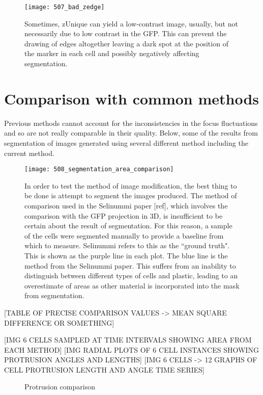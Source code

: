 \begin{figure}[h!]
 \centering
 \texttt{[image: 507\_bad\_zedge]}
 \caption[Ineffective zEdge]{
 	Sometimes, zUnique can yield a low-contrast image, usually, but not necessarily due to low contrast in the GFP. This can prevent the drawing of edges altogether leaving a dark spot at the position of the marker in each cell and possibly negatively affecting segmentation.
 }
 \label{fig:badzedge}
\end{figure}

\section{Comparison with common methods}

Previous methods cannot account for the inconsistencies in the focus fluctuations and so are not really comparable in their quality. Below, some of the results from segmentation of images generated using several different method including the current method.

\begin{figure}[h!]
 \centering
 \texttt{[image: 508\_segmentation\_area\_comparison]}
 \caption[Testing: segmentation area comparison]{
 	In order to test the method of image modification, the best thing to be done is attempt to segment the images produced. The method of comparison used in the Selinummi paper [ref], which involves the comparison with the GFP projection in 3D, is insufficient to be certain about the result of segmentation. For this reason, a sample of the cells were segmented manually to provide a baseline from which to measure. Selinummi refers to this as the ``ground truth". This is shown as the purple line in each plot. The blue line is the method from the Selinummi paper. This suffers from an inability to distinguish between different types of cells and plastic, leading to an overestimate of areas as other material is incorporated into the mask from segmentation.
 }
 \label{fig:areacomparison}
\end{figure}

[TABLE OF PRECISE COMPARISON VALUES -> MEAN SQUARE DIFFERENCE OR SOMETHING]

[IMG 6 CELLS SAMPLED AT TIME INTERVALS SHOWING AREA FROM EACH METHOD]
[IMG RADIAL PLOTS OF 6 CELL INSTANCES SHOWING PROTRUSION ANGLES AND LENGTHS]
[IMG 6 CELLS -> 12 GRAPHS OF CELL PROTRUSION LENGTH AND ANGLE TIME SERIES]

\begin{figure}[h!]
 \centering
 \caption{
 	Protrusion comparison
 }
 \label{fig:protrusioncomparison}
\end{figure}

